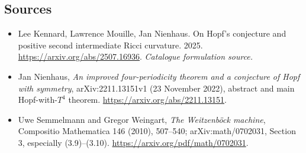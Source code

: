 \documentclass[11pt,a4paper]{article}
\begin{document}
\subsection{Sources}
\begin{itemize}\raggedright
\item[\textnormal{[S1]}]\hypertarget{source:statement:1}{} Lee Kennard, Lawrence Mouille, Jan Nienhaus. On Hopf's conjecture and positive second intermediate Ricci curvature. 2025.
\url{https://arxiv.org/abs/2507.16936}.
{\small\textit{Catalogue formulation source.}}
\item[\textnormal{[E1]}]\hypertarget{extra:statement:1}{} Jan Nienhaus,
\emph{An improved four-periodicity theorem and a conjecture of Hopf with symmetry},
arXiv:2211.13151v1 (23 November 2022), abstract and main Hopf-with-$T^4$ theorem.
\url{https://arxiv.org/abs/2211.13151}.
\item[\textnormal{[E2]}]\hypertarget{extra:statement:2}{} Uwe Semmelmann and Gregor Weingart,
\emph{The Weitzenb\"ock machine}, Compositio Mathematica 146 (2010), 507--540;
arXiv:math/0702031, Section 3, especially (3.9)--(3.10).
\url{https://arxiv.org/pdf/math/0702031}.
\end{itemize}
\end{document}
